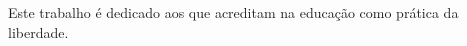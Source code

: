 \begin{dedicatoria}
   \vspace*{\fill}

{%
	\noindent\hspace{.5\textwidth}
	{\begin{minipage}{.5\textwidth}
			\begin{flushleft}
				Este trabalho é dedicado aos que acreditam na educação como prática da liberdade.
			\end{flushleft}
	\end{minipage}}%
\vspace*{3cm}
}%

\end{dedicatoria}
